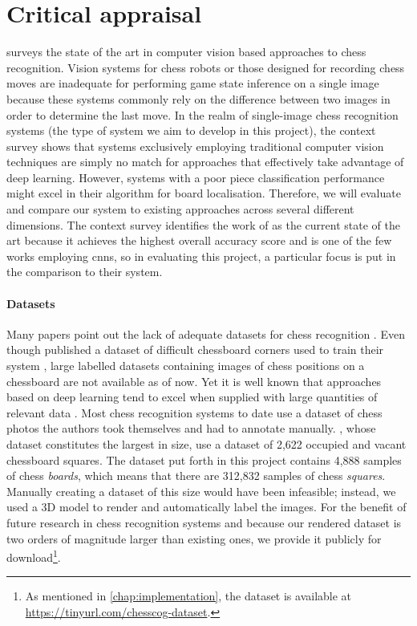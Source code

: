 \documentclass[../main.tex]{subfiles}
\begin{document}
\section{Critical appraisal}
 surveys the state of the art in computer vision based approaches to chess recognition. 
Vision systems for chess robots or those designed for recording chess moves are inadequate for performing game state inference on a single image because these systems commonly rely on the difference between two images in order to determine the last move.
In the realm of single-image chess recognition systems (the type of system we aim to develop in this project), the context survey shows that systems exclusively employing traditional computer vision techniques are simply no match for approaches that effectively take advantage of deep learning.
However, systems with a poor piece classification performance might excel in their algorithm for board localisation.
Therefore, we will evaluate and compare our system to existing approaches across several different dimensions.
The context survey identifies the work of \textcite{mehta2020} as the current state of the art because it achieves the highest overall accuracy score and is one of the few works employing \glspl{cnn}, so in evaluating this project, a particular focus is put in the comparison to their system.

\paragraph{Datasets}
Many papers point out the lack of adequate datasets for chess recognition \cite{czyzewski2020,ding2016,mehta2020}.
Even though \citeauthor{czyzewski2018} published a dataset \cite{czyzewski2018} of difficult chessboard corners used to train their system \cite{czyzewski2020}, large labelled datasets containing images of chess positions on a chessboard are not available as of now.
Yet it is well known that approaches based on deep learning tend to excel when supplied with large quantities of relevant data \cite{halevy2009}.
Most chess recognition systems to date use a dataset of chess photos the authors took themselves and had to annotate manually.
\Textcite{mehta2020}, whose dataset constitutes the largest in size, use a dataset of 2,622 occupied and vacant chessboard squares.
The dataset put forth in this project contains 4,888 samples of chess \emph{boards}, which means that there are 312,832 samples of chess \emph{squares}.
Manually creating a dataset of this size would have been infeasible; instead, we used a 3D model to render and automatically label the images.
For the benefit of future research in chess recognition systems and because our rendered dataset is two orders of magnitude larger than existing ones, we provide it publicly for download\footnote{As mentioned in \cref{chap:implementation}, the dataset is available at \url{https://tinyurl.com/chesscog-dataset}.}.
\end{document}
